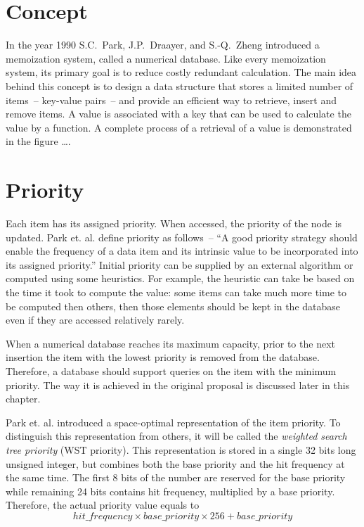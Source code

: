 

\section{Concept}
In the year 1990 S.C.~Park, J.P.~Draayer, and S.-Q.~Zheng introduced a memoization system, called a numerical database\cite{park90}. Like every memoization system, its primary goal is to reduce costly redundant calculation. The main idea behind this concept is to design a data structure that stores a limited number of items~-- key-value pairs~-- and provide an efficient way to retrieve, insert and remove items. A value is associated with a key that can be used to calculate the value by a function. A complete process of a retrieval of a value is demonstrated in the figure ….

\section{Priority}

Each item has its assigned priority. When accessed, the priority of the node is updated. Park et. al. define priority as follows~-- ``A good priority strategy should enable the frequency of a data item and its intrinsic value to be incorporated into its assigned priority.'' Initial priority can be supplied by an external algorithm or computed using some heuristics. For example, the heuristic can take be based on the time it took to compute the value: some items can take much more time to be computed then others, then those elements should be kept in the database even if they are accessed relatively rarely.

When a numerical database reaches its maximum capacity, prior to the next insertion the item with the lowest priority is removed from the database. Therefore, a database should support queries on the item with the minimum priority. The way it is achieved in the original proposal is discussed later in this chapter.

Park et. al. introduced a space-optimal representation of the item priority. To distinguish this representation from others, it will be called the \emph{weighted search tree priority} (WST priority). This representation is stored in a single 32 bits long unsigned integer, but combines both the base priority and the hit frequency at the same time. The first 8 bits of the number are reserved for the base priority while remaining 24 bits contains hit frequency, multiplied by a base priority.
Therefore, the actual priority value equals to
\[hit\_frequency \times base\_priority \times 256 + base\_priority\]

